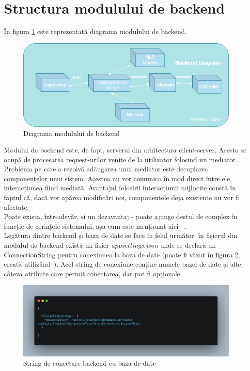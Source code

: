 \section{Structura modulului de backend}
În figura \ref{fig:backendDiagram} este reprezentată diagrama modulului de backend.
\begin{figure}[H]
	\centering
	\includegraphics[width=150mm]{figs/backendDiagram.png}
	\caption{Diagrama modulului de backend}
	\label{fig:backendDiagram}
\end{figure}

Modulul de backend este, de fapt, serverul din arhitectura client-server. Acesta se ocupă de procesarea request-urilor venite de la utilizator folosind un mediator.\\
Problema pe care o rezolvă adăugarea unui mediator este decuplarea componentelor unui sistem. Acestea nu vor comunica în mod direct între ele, interacțiunea fiind mediată. Avantajul folosirii interacțiunii mijlocite 
constă în faptul că, dacă vor apărea modificări noi, componentele deja existente nu vor fi afectate. \\
Poate exista, într-adevăr, și un dezavantaj - poate ajunge destul de complex în funcție de cerințele sistemului, așa cum este menționat aici ~\cite{MediatorDisadvantage}.\\

Legătura dintre backend și baza de date se face în felul următor: în fișierul din modulul de backend există un fișier {\it appsettings.json} unde se declară un ConnectionString pentru conexiunea la baza de date (poate fi văzut în figura \ref{fig:connectionString}, creată utilizând~\cite{Carbon}). Acel string de conexiune conține numele
bazei de date și alte câteva atribute care permit conectarea, dar pot fi opționale. 

\begin{figure}[H]
	\centering
	\includegraphics[width=150mm]{figs/connectionString.png}
	\caption{String de conectare backend cu baza de date}
	\label{fig:connectionString}
\end{figure}

